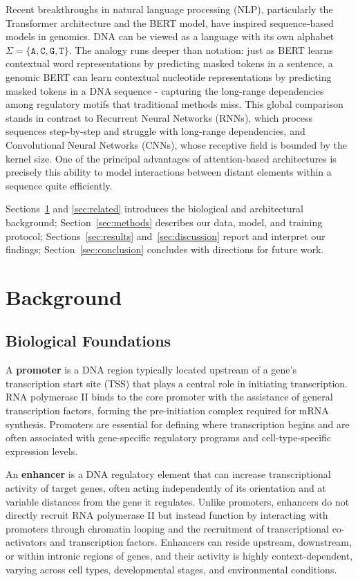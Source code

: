 \documentclass[11pt,a4paper,twoside]{article}
\begin{document}
Recent breakthroughs in natural language processing (NLP), particularly the Transformer architecture and the BERT model, have inspired sequence‑based models in genomics. DNA can be viewed as a language with its own alphabet $\Sigma = \{\texttt{A},\texttt{C},\texttt{G},\texttt{T}\}$.
The analogy runs deeper than notation: just as BERT learns contextual word representations by predicting masked tokens in a sentence, a genomic BERT can learn contextual nucleotide representations by predicting masked tokens in a DNA sequence - capturing the long-range dependencies among regulatory motifs that traditional methods miss. 
This global comparison stands in contrast to Recurrent Neural Networks (RNNs), which process sequences step-by-step and struggle with long-range dependencies, and Convolutional Neural Networks (CNNs), whose receptive field is bounded by the kernel size.
One of the principal advantages of attention-based architectures is precisely this ability to model interactions between distant elements within a sequence quite efficiently.

Sections~\ref{sec:background} and \ref{sec:related} introduces the biological and architectural background; Section~\ref{sec:methods} describes our data, model, and
training protocol; Sections~\ref{sec:results} and~\ref{sec:discussion}
report and interpret our findings; Section~\ref{sec:conclusion} concludes
with directions for future work.

\section{Background}
\label{sec:background}

\subsection{Biological Foundations}
A \textbf{promoter} is a DNA region typically located upstream of a gene's transcription start site (TSS) that plays a central role in initiating transcription. RNA polymerase II binds to the core promoter with the assistance of general transcription factors, forming the pre-initiation complex required for mRNA synthesis. Promoters are essential for defining where transcription begins and are often associated with gene-specific regulatory programs and cell-type-specific expression levels.

An \textbf{enhancer} is a DNA regulatory element that can increase transcriptional activity of target genes, often acting independently of its orientation and at variable distances from the gene it regulates. Unlike promoters, enhancers do not directly recruit RNA polymerase II but instead function by interacting with promoters through chromatin looping and the recruitment of transcriptional co-activators and transcription factors. Enhancers can reside upstream, downstream, or within intronic regions of genes, and their activity is highly context-dependent, varying across cell types, developmental stages, and environmental conditions.
\end{document}
